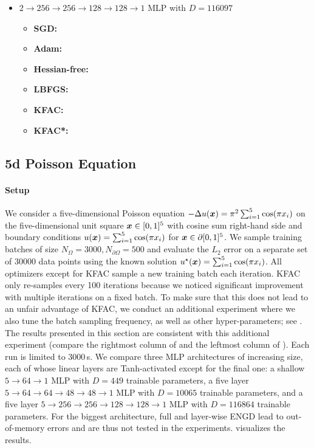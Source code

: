 \begin{itemize}
\item $2 \to 256 \to 256\to 128 \to 128 \to 1$ MLP with $D=\num{116097}$
  \begin{itemize}
    \def\pathToRuns{../kfac_pinns_exp/exp20_poisson2d_mlp_tanh_256/tex}
  \item \textbf{SGD:} 
  \item \textbf{Adam:} 
  \item \textbf{Hessian-free:} 
  \item \textbf{LBFGS:} 
  \item \textbf{KFAC:} 
  \item \textbf{KFAC*:} 
  \end{itemize}
\end{itemize}

\subsection{5d Poisson Equation}

\paragraph{Setup} We consider a five-dimensional Poisson equation $-\Delta u({\bm{x}}) = \pi^2 \sum_{i=1}^5 \cos(\pi {x}_i)$ on the five-dimensional unit square ${\bm{x}} \in [0, 1]^5$ with cosine sum right-hand side and boundary conditions $u({\bm{x}}) = \sum_{i=1}^5 \cos(\pi {x}_i)$ for ${\bm{x}} \in \partial [0,1]^5$.
We sample training batches of size $N_{\Omega} = \num{3000}, N_{\partial\Omega} = 500$ and evaluate the $L_2$ error on a separate set of $\num{30000}$ data points using the known solution $u^{\star}({\bm{x}}) = \sum_{i=1}^5 \cos(\pi {x}_i)$.
All optimizers except for KFAC sample a new training batch each iteration.
KFAC only re-samples every 100 iterations because we noticed  significant improvement with multiple iterations on a fixed batch.
To make sure that this does not lead to an unfair advantage of KFAC, we conduct an additional experiment where we also tune the batch sampling frequency, as well as other hyper-parameters; see .
The results presented in this section are consistent with this additional experiment (compare the rightmost column of  and the leftmost column of ).
Each run is limited to 3000\,s.
We compare three MLP architectures of increasing size, each of whose linear layers are Tanh-activated except for the final one: a shallow $5\to 64\to 1$ MLP with $D=449$ trainable parameters, a five layer $5 \to 64 \to 64 \to 48 \to 48 \to 1$ MLP with $D=\num{10065}$ trainable parameters, and a five layer $5 \to 256 \to 256\to 128 \to 128 \to 1$ MLP with $D=\num{116864}$ trainable parameters.
For the biggest architecture, full and layer-wise ENGD lead to out-of-memory errors and are thus not tested in the experiments.
 visualizes the results.

